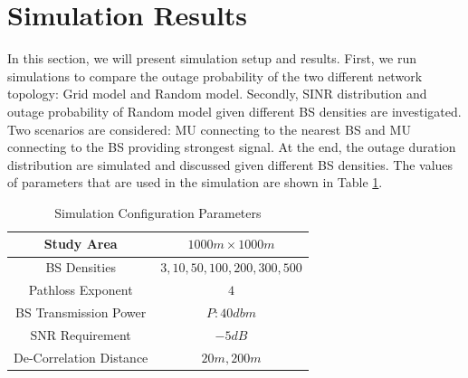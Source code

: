\section{Simulation Results}
\label{SimuProb}
\par In this section, we will present simulation setup and results. First, we run simulations to compare the outage probability of the two different network topology: Grid model and Random model. Secondly, SINR distribution and outage probability of Random model given different BS densities are investigated. Two scenarios are considered: MU connecting to the nearest BS and MU connecting to the BS providing strongest signal. At the end, the outage duration distribution are simulated and discussed given different BS densities. The values of parameters that are used in the simulation are shown in Table \ref{SystemConfig2}. 
\begin{table}
\centering
\caption{\label{SystemConfig2}Simulation Configuration Parameters}

\begin{tabular}{|c|c|}

\hline
Study Area & $1000m\times 1000m$\\
\hline
BS Densities & $3, 10, 50, 100, 200, 300, 500$\\
\hline
Pathloss Exponent & $4$\\
\hline
BS Transmission Power & $P: 40dbm$\\
\hline
SNR Requirement & $-5dB$\\
\hline
De-Correlation Distance & $20m, 200m$\\
\hline
\end{tabular}

\end{table}

